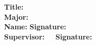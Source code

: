 \cleardoublepage %


\begin{flushleft}
{
\renewcommand{\baselinestretch}{1}
\textsf{\textbf{Title: \the\ETitle}\\
    \vspace*{14pt}
    \textbf{Major: \the\Emajor}\\
    \vspace*{14pt}
    \textbf{Name: \the\EStudentAuthor}\hfill \textbf{Signature:} \thickuline{\quad\quad\quad\quad\quad\quad}\\
    \vspace*{14pt}
    \textbf{Supervisor: \the\EsupervisorTitle~~\the\Esupervisor}\hfill \textbf{Signature:} \thickuline{\quad\quad\quad\quad\quad\quad}\\
}}
\end{flushleft}

